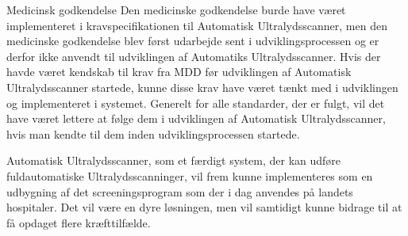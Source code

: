 Medicinsk godkendelse
Den medicinske godkendelse burde have været implementeret i kravspecifikationen til Automatisk Ultralydsscanner, men den medicinske godkendelse blev først udarbejde sent i udviklingsprocessen og er derfor ikke anvendt til udviklingen af Automatiks Ultralydsscanner. Hvis der havde været kendskab til krav fra MDD før udviklingen af Automatisk Ultralydsscanner startede, kunne disse krav have været tænkt med i udviklingen og implementeret i systemet. Generelt for alle standarder, der er fulgt, vil det have været lettere at følge dem i udviklingen af Automatisk Ultralydsscanner, hvis man kendte til dem inden udviklingsprocessen startede. 

Automatisk Ultralydsscanner, som et færdigt system, der kan udføre fuldautomatiske Ultralydsscanninger, vil frem kunne implementeres som en udbygning af det screeningsprogram som der i dag anvendes på landets hospitaler. Det vil være en dyre løsningen, men vil samtidigt kunne bidrage til at få opdaget flere kræfttilfælde. 

